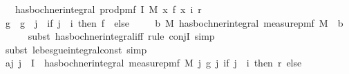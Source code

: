 \begin{isabellebody}
\ \ \ {\isachardoublequoteopen}has{\isacharunderscore}{\kern0pt}bochner{\isacharunderscore}{\kern0pt}integral\ {\isacharparenleft}{\kern0pt}prod{\isacharunderscore}{\kern0pt}pmf\ I\ M{\isacharparenright}{\kern0pt}\ {\isacharparenleft}{\kern0pt}{\isasymlambda}x{\isachardot}{\kern0pt}\ {\isacharparenleft}{\kern0pt}f\ {\isacharparenleft}{\kern0pt}x\ i{\isacharparenright}{\kern0pt}{\isacharparenright}{\kern0pt}{\isacharparenright}{\kern0pt}\ r{\isachardoublequoteclose}\isanewline
%
\isadelimproof
%
\endisadelimproof
%
\isatagproof
{}\isamarkupfalse%
\ {\isacharminus}{\kern0pt}\isanewline
\ \ \isamarkupfalse%
\ g\ \ {\isachardoublequoteopen}g\ {\isacharequal}{\kern0pt}\ {\isacharparenleft}{\kern0pt}{\isasymlambda}j\ {\isasymomega}{\isachardot}{\kern0pt}\ if\ j\ {\isacharequal}{\kern0pt}\ i\ then\ f\ {\isasymomega}\ else\ {}{\isacharparenright}{\kern0pt}{\isachardoublequoteclose}\isanewline
\isanewline
\ \ \isamarkupfalse%
\ b{\isacharcolon}{\kern0pt}\ {\isachardoublequoteopen}{\isasymAnd}M{\isachardot}{\kern0pt}\ has{\isacharunderscore}{\kern0pt}bochner{\isacharunderscore}{\kern0pt}integral\ {\isacharparenleft}{\kern0pt}measure{\isacharunderscore}{\kern0pt}pmf\ M{\isacharparenright}{\kern0pt}\ {\isacharparenleft}{\kern0pt}{\isasymlambda}{\isasymomega}{\isachardot}{\kern0pt}\ {}{\isacharcolon}{\kern0pt}{\isacharcolon}{\kern0pt}{\isacharprime}{\kern0pt}b{\isacharparenright}{\kern0pt}\ {}{\isachardoublequoteclose}\isanewline
\ \ \ \ \isamarkupfalse%
\ {\isacharparenleft}{\kern0pt}subst\ has{\isacharunderscore}{\kern0pt}bochner{\isacharunderscore}{\kern0pt}integral{\isacharunderscore}{\kern0pt}iff{\isacharcomma}{\kern0pt}\ rule\ conjI{\isacharcomma}{\kern0pt}\ simp{\isacharparenright}{\kern0pt}\isanewline
\ \ \ \ \isamarkupfalse%
\ {\isacharparenleft}{\kern0pt}subst\ lebesgue{\isacharunderscore}{\kern0pt}integral{\isacharunderscore}{\kern0pt}const{\isacharcomma}{\kern0pt}\ simp{\isacharparenright}{\kern0pt}\isanewline
\ \ \isanewline
\ \ \isamarkupfalse%
\ a{\isacharcolon}{\kern0pt}{\isachardoublequoteopen}{\isasymAnd}j{\isachardot}{\kern0pt}\ j\ {\isasymin}\ I\ {\isasymLongrightarrow}\ has{\isacharunderscore}{\kern0pt}bochner{\isacharunderscore}{\kern0pt}integral\ {\isacharparenleft}{\kern0pt}measure{\isacharunderscore}{\kern0pt}pmf\ {\isacharparenleft}{\kern0pt}M\ j{\isacharparenright}{\kern0pt}{\isacharparenright}{\kern0pt}\ {\isacharparenleft}{\kern0pt}g\ j{\isacharparenright}{\kern0pt}\ {\isacharparenleft}{\kern0pt}if\ j\ {\isacharequal}{\kern0pt}\ i\ then\ r\ else\ {}{\isacharparenright}{\kern0pt}{\isachardoublequoteclose}\isanewline

\end{isabellebody}
